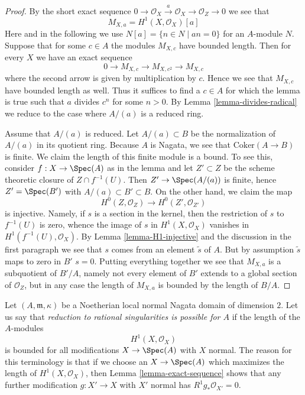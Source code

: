\begin{proof}
By the short exact sequence
$
0 \to \mathcal{O}_X \xrightarrow{a} \mathcal{O}_X \to \mathcal{O}_Z \to 0
$
we see that
\begin{equation}
\label{equation-a-torsion}
M_{X, a} = H^1(X, \mathcal{O}_X)[a]
\end{equation}
Here and in the following we use $N[a] = \{n \in N \mid an = 0\}$ for an
$A$-module $N$.
Suppose that for some $c \in A$ the modules $M_{X, c}$ have bounded length.
Then for every $X$ we have an exact sequence
$$
0 \to M_{X, c} \to M_{X, c^2} \to M_{X, c}
$$
where the second arrow is given by multiplication by $c$. Hence we see that
$M_{X, c}$ have bounded length as well. Thus it suffices to find a $c \in A$
for which the lemma is true such that $a$ divides $c^n$ for some $n > 0$.
By Lemma \ref{lemma-divides-radical} we reduce to the case where $A/(a)$
is a reduced ring.

\medskip\noindent
Assume that $A/(a)$ is reduced. Let $A/(a) \subset B$ be the normalization
of $A/(a)$ in its quotient ring. Because $A$ is Nagata, we see that
$\text{Coker}(A \to B)$ is finite. We claim the length of this finite
module is a bound. To see this, consider $f : X \to \Spec(A)$ as in the lemma
and let $Z' \subset Z$ be the scheme theoretic closure of $Z \cap f^{-1}(U)$.
Then $Z' \to \Spec(A/(a))$ is finite, hence $Z' = \Spec(B')$ with
$A/(a) \subset B' \subset B$. On the other hand, we claim the map
$$
H^0(Z, \mathcal{O}_Z) \to H^0(Z', \mathcal{O}_{Z'})
$$
is injective. Namely, if $s$ is a section in the kernel, then
the restriction of $s$ to $f^{-1}(U)$ is zero, whence
the image of $s$ in $H^1(X, \mathcal{O}_X)$ vanishes in
$H^1(f^{-1}(U), \mathcal{O}_X)$. By Lemma \ref{lemma-H1-injective}
and the discussion in the first paragraph we see that $s$ comes from an
element $\tilde s$ of $A$. But by assumption $\tilde s$ maps to
zero in $B'$ $s = 0$.
Putting everything together we see that
$M_{X, a}$ is a subquotient of $B'/A$, namely not every element
of $B'$ extends to a global section of $\mathcal{O}_Z$, but in
any case the length of $M_{X, a}$ is bounded by the length of $B/A$.
\end{proof}

\noindent
Let $(A, \mathfrak m, \kappa)$ be a Noetherian local normal Nagata domain
of dimension $2$. Let us say that {\it reduction to rational singularities
is possible for $A$} if the length of the $A$-modules
$$
H^1(X, \mathcal{O}_X)
$$
is bounded for all modifications $X \to \Spec(A)$ with $X$ normal. The
reason for this terminology is that if we choose an $X \to \Spec(A)$
which maximizes the length of $H^1(X, \mathcal{O}_X)$, then
Lemma \ref{lemma-exact-sequence}
shows that any further modification $g : X' \to X$ with $X'$ normal
has $R^1g_*\mathcal{O}_{X'} = 0$.

